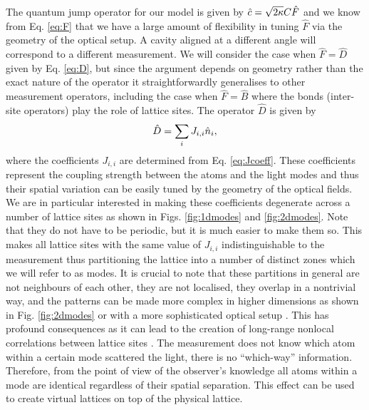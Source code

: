 The quantum jump operator for our model is given by
$\hat{c} = \sqrt{2 \kappa} C \hat{F}$ and we know from Eq. \eqref{eq:F}
that we have a large amount of flexibility in tuning $\hat{F}$ via the
geometry of the optical setup. A cavity aligned at a different angle
will correspond to a different measurement. We will consider the case
when $\hat{F} = \hat{D}$ given by Eq. \eqref{eq:D}, but since the
argument depends on geometry rather than the exact nature of the
operator it straightforwardly generalises to other measurement
operators, including the case when $\hat{F} = \hat{B}$ where the bonds
(inter-site operators) play the role of lattice sites. The operator
$\hat{D}$ is given by
\begin{equation}
  \hat{D} = \sum_i J_{i,i} \hat{n}_i,
\end{equation}
where the coefficients $J_{i,i}$ are determined from
Eq. \eqref{eq:Jcoeff}. These coefficients represent the coupling
strength between the atoms and the light modes and thus their spatial
variation can be easily tuned by the geometry of the optical
fields. We are in particular interested in making these coefficients
degenerate across a number of lattice sites as shown in
Figs. \ref{fig:1dmodes} and \ref{fig:2dmodes}. Note that they do not
have to be periodic, but it is much easier to make them so. This makes
all lattice sites with the same value of $J_{i,i}$ indistinguishable
to the measurement thus partitioning the lattice into a number of
distinct zones which we will refer to as modes. It is crucial to note
that these partitions in general are not neighbours of each other,
they are not localised, they overlap in a nontrivial way, and the
patterns can be made more complex in higher dimensions as shown in
Fig. \ref{fig:2dmodes} or with a more sophisticated optical setup
\cite{caballero2016}. This has profound consequences as it can lead to
the creation of long-range nonlocal correlations between lattice sites
\cite{mazzucchi2016, kozlowski2016zeno}. The measurement does not know
which atom within a certain mode scattered the light, there is no
``which-way'' information. Therefore, from the point of view of the
observer's knowledge all atoms within a mode are identical regardless
of their spatial separation. This effect can be used to create virtual
lattices on top of the physical lattice.

